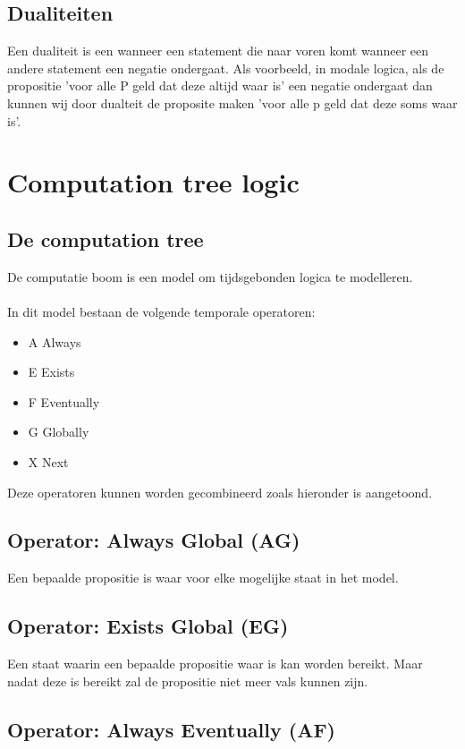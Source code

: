 \documentclass{article}
\begin{document}
\subsection{Dualiteiten}

Een dualiteit is een wanneer een statement die naar voren komt wanneer een andere statement een negatie ondergaat. Als voorbeeld, in modale logica, als de propositie 'voor alle P geld dat deze altijd waar is' een negatie ondergaat dan kunnen wij door dualteit de proposite maken 'voor alle p geld dat deze soms waar is'.

\section{Computation tree logic}

\subsection{De computation tree}

De computatie boom is een model om tijdsgebonden logica te modelleren. \\\\
In dit model bestaan de volgende temporale operatoren:
\begin{itemize}
    \item A Always
    \item E Exists
    \item F Eventually
    \item G Globally
    \item X Next
\end{itemize}
Deze operatoren kunnen worden gecombineerd zoals hieronder is aangetoond.

\subsection{Operator: Always Global (AG)}

Een bepaalde propositie is waar voor elke mogelijke staat in het model.

\subsection{Operator: Exists Global (EG)}

Een staat waarin een bepaalde propositie waar is kan worden bereikt. Maar nadat deze is bereikt zal de propositie niet meer vals kunnen zijn.

\subsection{Operator: Always Eventually (AF)}
\end{document}
